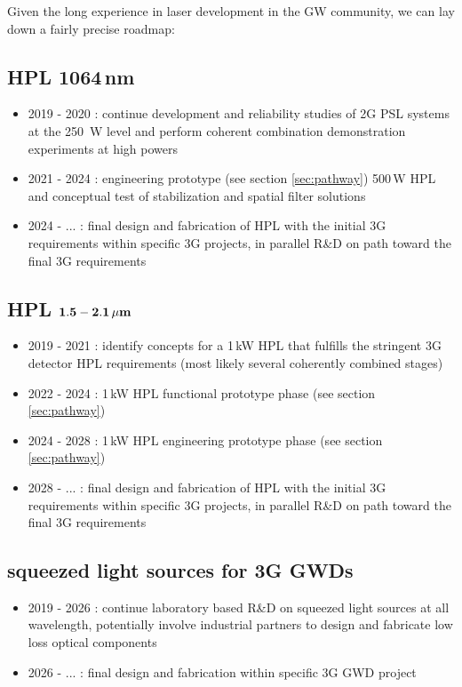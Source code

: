 Given the long experience in laser development in the GW community, we can lay down a fairly precise roadmap: 

\subsection*{HPL 1064\,nm}
\begin{itemize}
	\item 2019 - 2020 : continue development and reliability studies of 2G PSL systems at the 250\, W level and perform coherent combination demonstration experiments at high powers
	\item 2021 - 2024 : engineering prototype (see section \ref{sec:pathway}) 500\,W HPL and conceptual test of stabilization and spatial filter solutions
	\item 2024 - ... : final design and fabrication of HPL with the initial 3G requirements within specific 3G projects, in parallel R\&D on path toward the final 3G requirements 
\end{itemize} 


\subsection*{HPL ${\bf 1.5 - 2.1 \, {\bf \mu m}}$}
\begin{itemize}
	\item 2019 - 2021 : identify concepts for a 1\,kW HPL that fulfills the stringent 3G detector HPL requirements (most likely several coherently combined stages)
	\item 2022 - 2024 : 1\,kW HPL functional prototype phase (see section \ref{sec:pathway})
	\item 2024 - 2028 : 1\,kW HPL engineering prototype phase (see section \ref{sec:pathway})
	\item 2028 - ... : final design and fabrication of HPL with the initial 3G requirements within specific 3G projects, in parallel R\&D on path toward the final 3G requirements
\end{itemize} 


\subsection*{squeezed light sources for 3G GWDs}
\begin{itemize}
	\item 2019 - 2026 : continue laboratory based R\&D on squeezed light sources at all wavelength, potentially involve industrial partners to design and fabricate low loss optical components
	\item 2026 - ... : final design and fabrication within specific 3G GWD project
\end{itemize}

